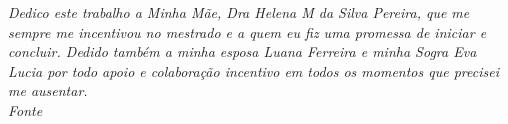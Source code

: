 \begin{flushright}
\begin{minipage}{17em}
\textit{Dedico este trabalho a Minha Mãe, Dra Helena M da Silva Pereira, que me sempre me incentivou no mestrado e a quem eu fiz uma promessa de iniciar e concluir. Dedido também a minha esposa Luana Ferreira e minha Sogra Eva Lucia por todo apoio e colaboração  incentivo em todos os momentos que precisei me ausentar. \\Fonte}
\end{minipage}
\end{flushright}
